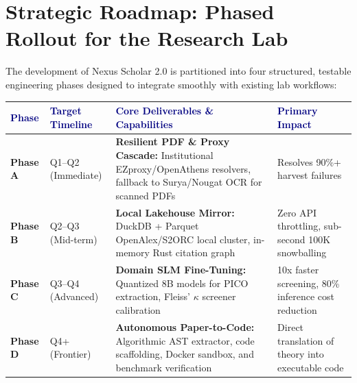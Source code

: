 \documentclass[10pt,a4paper]{article}
\begin{document}
\newpage
\section{Strategic Roadmap: Phased Rollout for the Research Lab}

The development of Nexus Scholar 2.0 is partitioned into four structured, testable engineering phases designed to integrate smoothly with existing lab workflows:

\vspace{4pt}
\begin{center}
\small
\renewcommand{\arraystretch}{1.25}
\begin{tabularx}{\textwidth}{@{} l l >{\raggedright\arraybackslash}X p{3.0cm} @{}}
\toprule
\textbf{\textcolor{Navy}{Phase}} & \textbf{\textcolor{Navy}{Target Timeline}} & \textbf{\textcolor{Navy}{Core Deliverables \& Capabilities}} & \textbf{\textcolor{Navy}{Primary Impact}} \\
\midrule
\textbf{Phase A} & Q1--Q2 (Immediate) & \textbf{Resilient PDF \& Proxy Cascade:} Institutional EZproxy/OpenAthens resolvers, fallback to Surya/Nougat OCR for scanned PDFs & Resolves 90\%+ harvest failures \\

\textbf{Phase B} & Q2--Q3 (Mid-term) & \textbf{Local Lakehouse Mirror:} DuckDB + Parquet OpenAlex/S2ORC local cluster, in-memory Rust citation graph & Zero API throttling, sub-second 100K snowballing \\

\textbf{Phase C} & Q3--Q4 (Advanced) & \textbf{Domain SLM Fine-Tuning:} Quantized 8B models for PICO extraction, Fleiss' $\kappa$ screener calibration & 10x faster screening, 80\% inference cost reduction \\

\textbf{Phase D} & Q4+ (Frontier) & \textbf{Autonomous Paper-to-Code:} Algorithmic AST extractor, code scaffolding, Docker sandbox, and benchmark verification & Direct translation of theory into executable code \\
\bottomrule
\end{tabularx}
\end{center}

\vspace{6pt}

\end{document}
